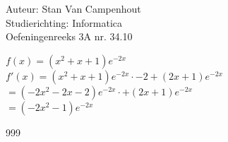 \documentclass[a4paper]{article}
\begin{document}
  
\noindent \large Auteur: Stan Van Campenhout \\
\noindent \large Studierichting:  Informatica\\
\noindent \large Oefeningenreeks 3A nr. 34.10\\

\medskip

\normalsize

$ f(x) = \left(x^2 + x + 1\right)e^{-2x} $\\

$ f'(x) = \left(x^2 + x + 1\right)e^{-2x} \cdot -2 + \left(2x + 1\right)e^{-2x} $\\

$ = \left(-2x^2 - 2x - 2\right)e^{-2x} \cdot + \left(2x + 1\right)e^{-2x} $\\

$ = \left(-2x^2 - 1\right)e^{-2x} $\\

\begin{thebibliography}{999}
\end{thebibliography}
\end{document}
